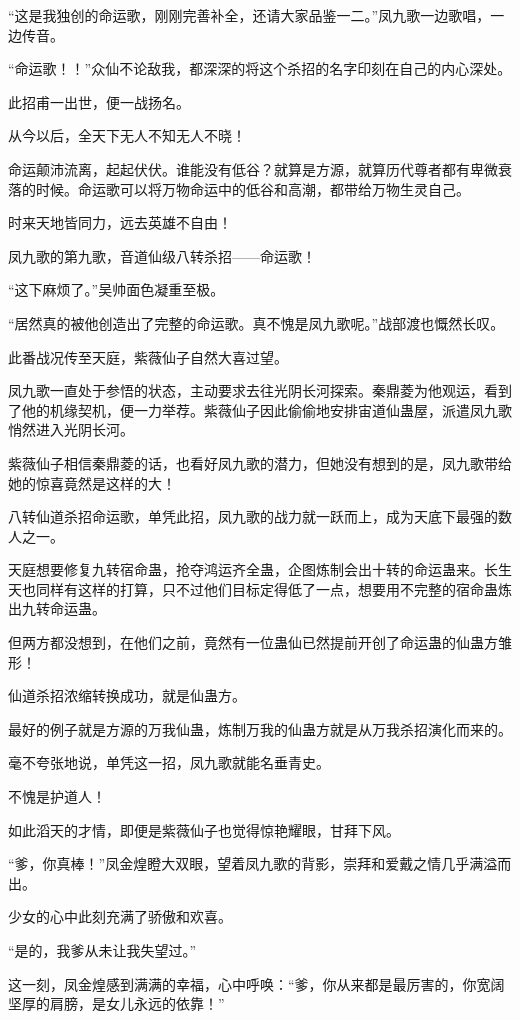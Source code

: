\begin{this_body}
“这是我独创的命运歌，刚刚完善补全，还请大家品鉴一二。”凤九歌一边歌唱，一边传音。

“命运歌！！”众仙不论敌我，都深深的将这个杀招的名字印刻在自己的内心深处。

此招甫一出世，便一战扬名。

从今以后，全天下无人不知无人不晓！

命运颠沛流离，起起伏伏。谁能没有低谷？就算是方源，就算历代尊者都有卑微衰落的时候。命运歌可以将万物命运中的低谷和高潮，都带给万物生灵自己。

时来天地皆同力，远去英雄不自由！

凤九歌的第九歌，音道仙级八转杀招——命运歌！

“这下麻烦了。”吴帅面色凝重至极。

“居然真的被他创造出了完整的命运歌。真不愧是凤九歌呢。”战部渡也慨然长叹。

此番战况传至天庭，紫薇仙子自然大喜过望。

凤九歌一直处于参悟的状态，主动要求去往光阴长河探索。秦鼎菱为他观运，看到了他的机缘契机，便一力举荐。紫薇仙子因此偷偷地安排宙道仙蛊屋，派遣凤九歌悄然进入光阴长河。

紫薇仙子相信秦鼎菱的话，也看好凤九歌的潜力，但她没有想到的是，凤九歌带给她的惊喜竟然是这样的大！

八转仙道杀招命运歌，单凭此招，凤九歌的战力就一跃而上，成为天底下最强的数人之一。

天庭想要修复九转宿命蛊，抢夺鸿运齐全蛊，企图炼制会出十转的命运蛊来。长生天也同样有这样的打算，只不过他们目标定得低了一点，想要用不完整的宿命蛊炼出九转命运蛊。

但两方都没想到，在他们之前，竟然有一位蛊仙已然提前开创了命运蛊的仙蛊方雏形！

仙道杀招浓缩转换成功，就是仙蛊方。

最好的例子就是方源的万我仙蛊，炼制万我的仙蛊方就是从万我杀招演化而来的。

毫不夸张地说，单凭这一招，凤九歌就能名垂青史。

不愧是护道人！

如此滔天的才情，即便是紫薇仙子也觉得惊艳耀眼，甘拜下风。

“爹，你真棒！”凤金煌瞪大双眼，望着凤九歌的背影，崇拜和爱戴之情几乎满溢而出。

少女的心中此刻充满了骄傲和欢喜。

“是的，我爹从未让我失望过。”

这一刻，凤金煌感到满满的幸福，心中呼唤：“爹，你从来都是最厉害的，你宽阔坚厚的肩膀，是女儿永远的依靠！”

\end{this_body}

